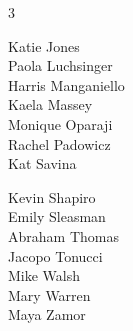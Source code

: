 \documentclass{article}[10pt]
\begin{document}
\begin{minipage}{115mm}
\begin{center}
{\begin{multicols*}{3}
\begin{center}
\begin{normalsize}
{Katie Jones}\\
{Paola Luchsinger}\\
{Harris Manganiello}\\
{Kaela Massey}\\
{Monique Oparaji}\\
{Rachel Padowicz}\\
{Kat Savina}\vfill\null
\columnbreak

{Kevin Shapiro}\\
{Emily Sleasman}\\
{Abraham Thomas}\\
{Jacopo Tonucci}\\
{Mike Walsh}\\
{Mary Warren}\\
{Maya Zamor}
                        \end{normalsize}
                    \end{center}
                \end{multicols*}
            }
        \end{center}

    \end{minipage}

    \pagebreak

\end{document}
